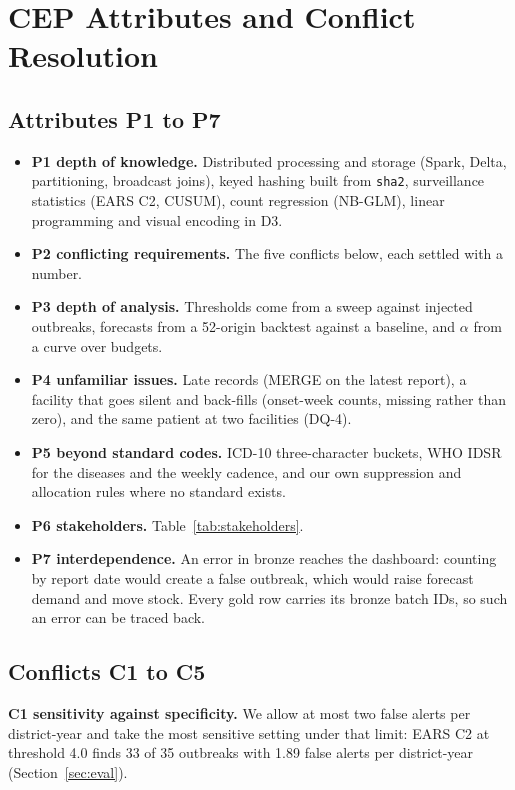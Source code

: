 \section{CEP Attributes and Conflict Resolution}
\subsection{Attributes P1 to P7}
\begin{itemize}
\item \textbf{P1 depth of knowledge.} Distributed processing and storage (Spark, Delta, partitioning, broadcast
joins), keyed hashing built from \texttt{sha2}, surveillance statistics (EARS C2, CUSUM), count regression (NB-GLM),
linear programming and visual encoding in D3.
\item \textbf{P2 conflicting requirements.} The five conflicts below, each settled with a number.
\item \textbf{P3 depth of analysis.} Thresholds come from a sweep against injected outbreaks, forecasts from a
52-origin backtest against a baseline, and $\alpha$ from a curve over budgets.
\item \textbf{P4 unfamiliar issues.} Late records (MERGE on the latest report), a facility that goes silent and
back-fills (onset-week counts, missing rather than zero), and the same patient at two facilities (DQ-4).
\item \textbf{P5 beyond standard codes.} ICD-10 three-character buckets, WHO IDSR~\cite{who2019idsr} for the
diseases and the weekly cadence, and our own suppression and allocation rules where no standard exists.
\item \textbf{P6 stakeholders.} Table~\ref{tab:stakeholders}.
\item \textbf{P7 interdependence.} An error in bronze reaches the dashboard: counting by report date would
create a false outbreak, which would raise forecast demand and move stock. Every gold row carries its bronze
batch IDs, so such an error can be traced back.
\end{itemize}

\subsection{Conflicts C1 to C5}
\textbf{C1 sensitivity against specificity.} We allow at most two false alerts per district-year and take the
most sensitive setting under that limit: EARS C2 at threshold 4.0 finds 33 of 35 outbreaks with 1.89 false
alerts per district-year (Section~\ref{sec:eval}).

